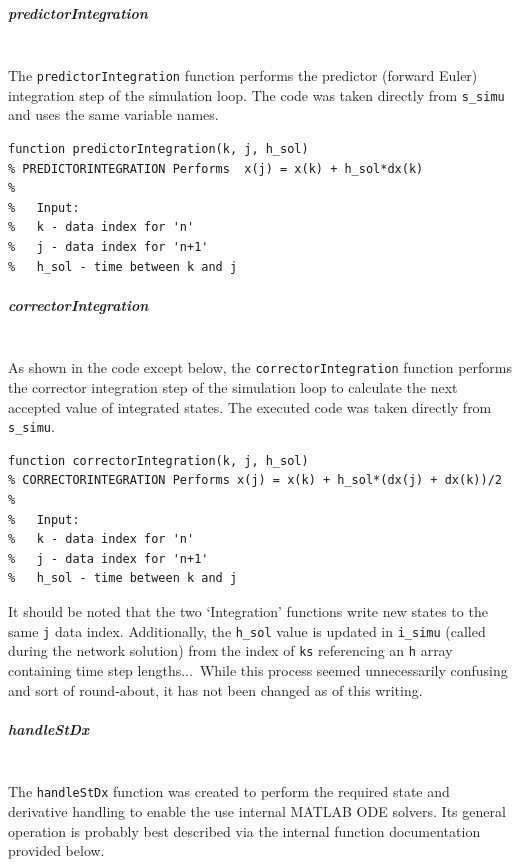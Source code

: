 \documentclass[12pt]{article}
\begin{document}
\subparagraph{predictorIntegration} \ \\
The \verb|predictorIntegration| function performs the predictor (forward Euler) integration step of the simulation loop.
The code was taken directly from \verb|s_simu| and uses the same variable names.

\begin{verbatim}
function predictorIntegration(k, j, h_sol)
% PREDICTORINTEGRATION Performs  x(j) = x(k) + h_sol*dx(k)
%
%   Input:
%   k - data index for 'n'
%   j - data index for 'n+1'
%   h_sol - time between k and j
\end{verbatim}


\subparagraph{correctorIntegration} \ \\
As shown in the code except below, the \verb|correctorIntegration| function performs the corrector integration step of the simulation loop to calculate the next accepted value of integrated states.
The executed code was taken directly from \verb|s_simu|.

\begin{verbatim}
function correctorIntegration(k, j, h_sol)
% CORRECTORINTEGRATION Performs x(j) = x(k) + h_sol*(dx(j) + dx(k))/2
%
%   Input:
%   k - data index for 'n'
%   j - data index for 'n+1'
%   h_sol - time between k and j
\end{verbatim}

It should be noted that the two `Integration' functions write new states to the same \verb|j| data index.
Additionally, the \verb|h_sol| value is updated in \verb|i_simu| (called during the network solution) from the index of \verb|ks| referencing an \verb|h| array containing time step lengths$\ldots$\ 
While this process seemed unnecessarily confusing and sort of  round-about, it has not been changed as of this writing.

\pagebreak
\subparagraph{handleStDx} \ \\
The \verb|handleStDx| function was created to perform the required state and derivative handling to enable the use internal MATLAB ODE solvers.
Its general operation is probably best described via the internal function documentation provided below.
\end{document}
